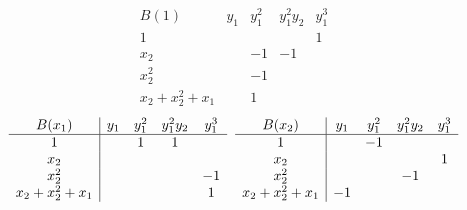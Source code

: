 \documentclass{standalone}
\begin{document}
$$
\begin{array}{c|cccc}
	B(1) & y_1 & y_1^2 & y_1^2y_2 & y_1^3 \\
	\hline
	1  &   &  &  & 1 \\
	x_2  &  & -1 & -1 & \\
	x_2^2  &  & -1 &  & \\
	x_2 + x_2^{2} + x_1  &  & 1 &  &
\end{array}$$
$$
\begin{array}{c|cccc}
	B(x_1)  & y_1 & y_1^2 & y_1^2y_2 & y_1^3 \\
	\hline
	1  &  & 1 & 1 & \\
	x_2  &  &  &  & \\
	x_2^2  &  &  &  & -1 \\
	x_2 + x_2^{2} + x_1  &  &  &  & 1
\end{array}
\hspace{0.2cm}
\begin{array}{c|cccc}
	B(x_2) & y_1 & y_1^2 & y_1^2y_2 & y_1^3 \\
	\hline
	1  &  & -1 &  & \\
	x_2  &  &  &  & 1 \\
	x_2^2  &  &  & -1 & \\
	x_2 + x_2^{2} + x_1  & -1 &  &  &
\end{array}$$
\end{document}

